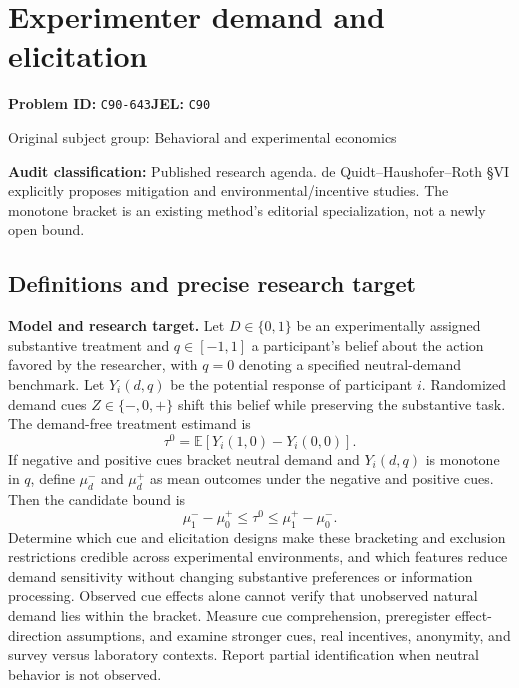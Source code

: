 \documentclass[11pt,a4paper]{article}
\begin{document}
\section*{Experimenter demand and elicitation}
\textbf{Problem ID:} \texttt{C90-643}\quad \textbf{JEL:} \texttt{C90}\par
\label{problem:OP-0307}
{\sffamily\small\color{muted}Original subject group: Behavioral and experimental economics\par}
\label{definitions:problem:30007589}
\textbf{Audit classification:} Published research agenda. de Quidt–Haushofer–Roth §VI explicitly proposes mitigation and environmental/incentive studies. The monotone bracket is an existing method’s editorial specialization, not a newly open bound.
\subsection*{Definitions and precise research target}
\textbf{Model and research target.} Let \(D\in\{0,1\}\) be an experimentally assigned substantive treatment and \(q\in[-1,1]\) a participant's belief about the action favored by the researcher, with \(q=0\) denoting a specified neutral-demand benchmark. Let \(Y_i(d,q)\) be the potential response of participant \(i\). Randomized demand cues \(Z\in\{-,0,+\}\) shift this belief while preserving the substantive task. The demand-free treatment estimand is
\[\tau^0=\mathbb E[Y_i(1,0)-Y_i(0,0)].\]
If negative and positive cues bracket neutral demand and \(Y_i(d,q)\) is monotone in \(q\), define \(\mu_d^-\) and \(\mu_d^+\) as mean outcomes under the negative and positive cues. Then the candidate bound is
\[\mu_1^- -\mu_0^+\leq\tau^0\leq\mu_1^+ -\mu_0^-.\]
Determine which cue and elicitation designs make these bracketing and exclusion restrictions credible across experimental environments, and which features reduce demand sensitivity without changing substantive preferences or information processing. Observed cue effects alone cannot verify that unobserved natural demand lies within the bracket. Measure cue comprehension, preregister effect-direction assumptions, and examine stronger cues, real incentives, anonymity, and survey versus laboratory contexts. Report partial identification when neutral behavior is not observed.
\end{document}
